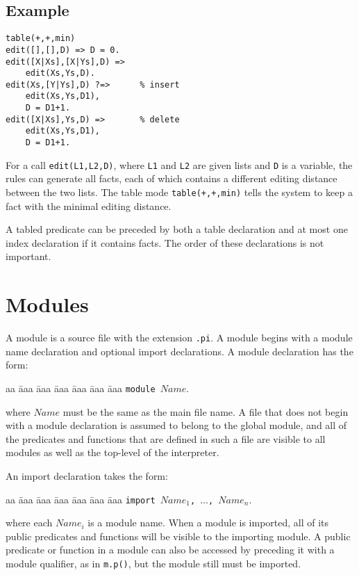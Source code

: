 \subsection*{Example}
\begin{verbatim}
table(+,+,min)
edit([],[],D) => D = 0.
edit([X|Xs],[X|Ys],D) =>   
    edit(Xs,Ys,D).
edit(Xs,[Y|Ys],D) ?=>      % insert
    edit(Xs,Ys,D1),
    D = D1+1.
edit([X|Xs],Ys,D) =>       % delete
    edit(Xs,Ys,D1),
    D = D1+1.
\end{verbatim}
For a call \texttt{edit(L1,L2,D)}, where \texttt{L1} and \texttt{L2} are given lists and \texttt{D} is a variable, the rules can generate all facts, each of which contains a different editing distance between the two lists. The table mode \texttt{table(+,+,min)} tells the system to keep a fact with the minimal editing distance. 

A tabled predicate can be preceded by both a table declaration and at most one index declaration if it contains facts. The order of these declarations is not important.

\section{Modules}
A module is a source file with the extension \texttt{.pi}. A module begins with a module name declaration and optional import declarations. A module declaration has the form: 
\begin{tabbing}
aa \= aaa \= aaa \= aaa \= aaa \= aaa \= aaa \kill
\> \texttt{module $Name$}.
\end{tabbing}
where $Name$ must be the same as the main file name. A file that does not begin with a module declaration is assumed to belong to the global module, and all of the predicates and functions that are defined in such a file are visible to all modules as well as the top-level of the interpreter. 

An import declaration takes the form: 
\begin{tabbing}
aa \= aaa \= aaa \= aaa \= aaa \= aaa \= aaa \kill
\> \texttt{import $Name_1$, $\ldots$, $Name_n$}.
\end{tabbing}
where each $Name_i$ is a module name. When a module is imported, all of its public predicates and functions will be visible to the importing module. A public predicate or function in a module can also be accessed by preceding it with a module qualifier, as in \texttt{m.p()}, but the module still must be imported.

